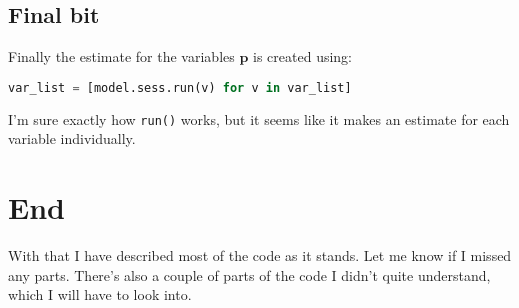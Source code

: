 \documentclass[a4paper]{article}
\begin{document}
\subsection{Final bit}

Finally the estimate for the variables $\mathbf{p}$ is created using:
\begin{lstlisting}[language=python]
var_list = [model.sess.run(v) for v in var_list]
\end{lstlisting}
I'm sure exactly how \lstinline|run()| works, but it seems like it makes an estimate for each variable individually. 



\section{End}

With that I have described most of the code as it stands. Let me know if I missed any parts. There's also a couple of parts of the code I didn't quite understand, which I will have to look into.




















	
\end{document}
